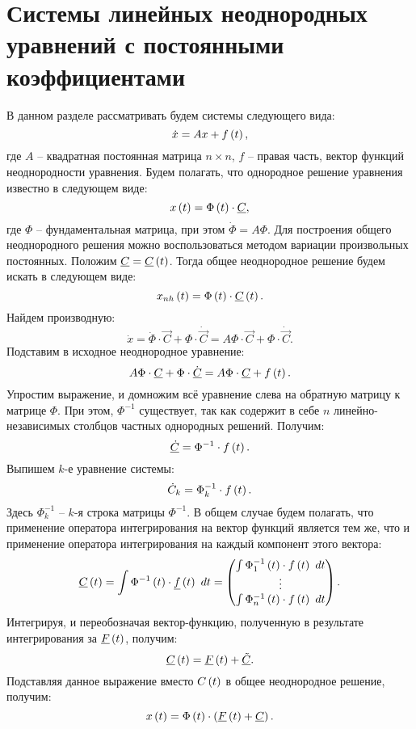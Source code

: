 \section{Системы линейных неоднородных уравнений с постоянными коэффициентами}
	
	В данном разделе рассматривать будем системы следующего вида:
	\[ \dot{x} = Ax + f\left( t \right), \]
	где $A$ -- квадратная постоянная матрица $n \times n$, $f$ -- правая часть, вектор функций неоднородности уравнения. Будем полагать, что однородное решение уравнения известно в следующем виде:
	\[ x\left( t \right) = \Phi\left( t \right) \cdot \underline{C}, \]
	где $\Phi$ -- фундаментальная матрица, при этом $\dot{\Phi} = A \Phi$. Для построения общего неоднородного решения можно воспользоваться методом вариации произвольных постоянных. Положим $\underline{C} = \underline{C}\left( t \right)$. Тогда общее неоднородное решение будем искать в следующем виде:
	\[ x_{nh}\left( t \right) = \Phi\left( t \right) \cdot \underline{C}\left( t \right). \]
	Найдем производную:
	\[ \dot{x} = \dot{\Phi} \cdot \vec{C} + \Phi \cdot \dot{\vec{C}} = A \Phi \cdot \vec{C} + \Phi \cdot \dot{\vec{C}}. \]
	Подставим в исходное неоднородное уравнение:
	\[ A\Phi \cdot \underline{C} + \Phi \cdot \dot{\underline{C}} = A \Phi \cdot \underline{C} + f\left( t \right). \]
	Упростим выражение, и домножим всё уравнение слева на обратную матрицу к матрице $\Phi$. При этом, $\Phi^{-1}$ существует, так как содержит в себе $n$ линейно-независимых столбцов частных однородных решений. Получим:
	\[ \underline{\dot{C}} = \Phi^{-1} \cdot f \left( t \right). \]
	Выпишем $k$-е уравнение системы:
	\[ \dot{C}_k = \Phi^{-1}_{k} \cdot f \left( t \right). \]
	Здесь $\Phi^{-1}_{k}$ -- $k$-я строка матрицы $\Phi^{-1}$. В общем случае будем полагать, что применение оператора интегрирования на вектор функций является тем же, что и применение оператора интегрирования на каждый компонент этого вектора: 
	\[ \underline{C} \left( t \right) = \int \Phi^{-1} \left( t \right) \cdot \underline{f} \left( t \right) ~ dt = \begin{pmatrix} \int \Phi^{-1}_1 \left( t \right) \cdot f \left( t \right) ~ dt \\ \vdots \\ \int \Phi^{-1}_n \left( t \right) \cdot f \left( t \right) ~ dt \end{pmatrix}. \]
	Интегрируя, и переобозначая вектор-функцию, полученную в результате интегрирования за $\underline{F} \left( t \right)$, получим:
	\[ \underline{C} \left( t \right) = \underline{F} \left( t \right) + \underline{\tilde{C}}. \]
	Подставляя данное выражение вместо $C\left( t \right)$ в общее неоднородное решение, получим:
	\[ x \left( t \right) = \Phi \left( t \right) \cdot \left( \underline{F} \left( t \right) + \underline{C} \right). \]

